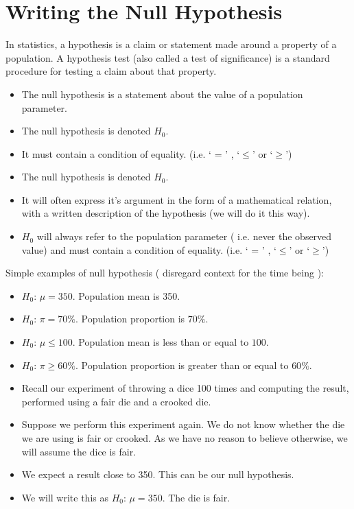 \documentclass[a4paper,12pt]{article}
\begin{document}
\section*{Writing the Null Hypothesis}


In statistics, a hypothesis is a claim or statement made around a property of a population.
A hypothesis test (also called a test of significance)  is a standard procedure for testing a claim about that property.
\begin{itemize}
	\item The null hypothesis is a statement about the value of a population parameter.
	\item The null hypothesis is denoted $H_0$.
	\item It must contain a condition of equality. (i.e. ` = ' , `$ \leq$' or `$\geq$')
\end{itemize}



\begin{itemize}
\item The null hypothesis is denoted $H_0$.
\item It will often express it's argument in the form of a mathematical relation, with a written description of the hypothesis (we will do it this way).
\item $H_0$ will always refer to the population parameter ( i.e. never the observed value) and must contain a condition of equality. (i.e. ` = ' , `$ \leq$' or `$\geq$')
\end{itemize}


Simple examples of null hypothesis ( disregard context for the time being ):
\begin{itemize}
	\item $H_0$:  $\mu = 350$. Population mean is 350.
	\item $H_0$:  $\pi = 70\%$. Population proportion is $70\%$.
	\item $H_0$:  $\mu \leq 100$. Population mean is less than or equal to $100$.
	\item $H_0$:  $\pi \geq 60\%$. Population proportion is greater than or equal to $60\%$.
	
\end{itemize}



\begin{itemize}
	\item Recall our experiment of throwing a dice 100 times and computing the result, performed using a fair die and a crooked die.
	\item Suppose we perform this experiment again. We do not know whether the die we are using is fair or crooked. As we have no reason to believe otherwise, we will assume the dice is fair.
	\item We expect a result close to 350. This can be our null hypothesis.
	\item We will write this as $H_0$:  $\mu = 350$. The die is fair.
\end{itemize}
\end{document}
